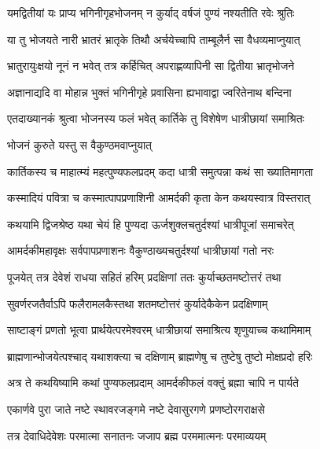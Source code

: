 \twolineshloka
{यमद्वितीयां यः प्राप्य भगिनीगृहभोजनम्}
{न कुर्याद् वर्षजं पुण्यं नश्यतीति रवेः श्रुतिः} %

\twolineshloka
{या तु भोजयते नारी भ्रातरं भ्रातृके तिथौ}
{अर्चयेच्चापि ताम्बूलैर्न सा वैधव्यमाप्नुयात्} %

\twolineshloka
{भ्रातुरायुःक्षयो नूनं न भवेत् तत्र कर्हिचित्}
{अपराह्णव्यापिनी सा द्वितीया भ्रातृभोजने} %

\twolineshloka
{अज्ञानाद्यदि वा मोहान्न भुक्तं भगिनीगृहे}
{प्रवासिना ह्यभावाद्वा ज्वरितेनाथ बन्दिना} %

\twolineshloka
{एतदाख्यानकं श्रुत्वा भोजनस्य फलं भवेत्}
{कार्तिके तु विशेषेण धात्रीछायां समाश्रितः} %


\onelineshloka
{भोजनं कुरुते यस्तु स वैकुण्ठमवाप्नुयात्} %





\twolineshloka
{कार्तिकस्य च माहात्म्यं महत्पुण्यफलप्रदम्}
{कदा धात्री समुत्पन्ना कथं सा ख्यातिमागता} %

\twolineshloka
{कस्मादियं पवित्रा च कस्मात्पापप्रणाशिनी}
{आमर्दकी कृता केन कथयस्वात्र विस्तरात्} %


\twolineshloka
{कथयामि द्विजश्रेष्ठ यथा चेयं हि पुण्यदा}
{ऊर्जशुक्लचतुर्दश्यां धात्रीपूजां समाचरेत्} %

\twolineshloka
{आमर्दकीमहावृक्षः सर्वपापप्रणाशनः}
{वैकुण्ठाख्यचतुर्दश्यां धात्रीछायां गतो नरः} %

\twolineshloka
{पूजयेत् तत्र देवेशं राधया सहितं हरिम्}
{प्रदक्षिणां ततः कुर्याच्छतमष्टोत्तरं तथा} %

\twolineshloka
{सुवर्णरजतैर्वाऽपि फलैरामलकैस्तथा}
{शतमष्टोत्तरं कुर्यादेकैकेन प्रदक्षिणाम्} %

\twolineshloka
{साष्टाङ्गं प्रणतो भूत्वा प्रार्थयेत्परमेश्वरम्}
{धात्रीछायां समाश्रित्य शृणुयाच्च कथामिमाम्} %

\twolineshloka
{ब्राह्मणान्भोजयेत्पश्चाद् यथाशक्त्या च दक्षिणाम्}
{ब्राह्मणेषु च तुष्टेषु तुष्टो मोक्षप्रदो हरिः} %

\twolineshloka
{अत्र ते कथयिष्यामि कथां पुण्यफलप्रदाम्}
{आमर्दकीफलं वक्तुं ब्रह्मा चापि न पार्यते} %


\twolineshloka
{एकार्णवे पुरा जाते नष्टे स्थावरजङ्गमे}
{नष्टे देवासुरगणे प्रणष्टोरगराक्षसे} %

\twolineshloka
{तत्र देवाधिदेवेशः परमात्मा सनातनः}
{जजाप ब्रह्म परममात्मनः परमाव्ययम्} %

